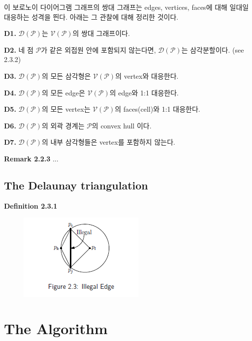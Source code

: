\documentclass{article}
\begin{document}
이 보로노이 다이어그램 그래프의 쌍대 그래프는 edges, vertices, faces에 대해 
일대일 대응하는 성격을 띈다. 아래는 그 관찰에 대해 정리한 것이다. 

\textbf{D1.} $\mathcal{D}(\mathcal{P})$는 $\mathcal{V}(\mathcal{P})$의 
쌍대 그래프이다. 

\textbf{D2.} 네 점 $\mathcal{P}$가 같은 외접원 안에 포함되지 않는다면, 
$\mathcal{D}(\mathcal{P})$는 삼각분할이다. (see 2.3.2)

\textbf{D3.}  $\mathcal{D}(\mathcal{P})$의 모든 삼각형은 
$\mathcal{V}(\mathcal{P})$의 vertex와 대응한다. 

\textbf{D4.}  $\mathcal{D}(\mathcal{P})$의 모든 edge은 
$\mathcal{V}(\mathcal{P})$의 edge와 1:1 대응한다. 

\textbf{D5.}  $\mathcal{D}(\mathcal{P})$의 모든 vertex는 
$\mathcal{V}(\mathcal{P})$의 faces(cell)와 1:1 대응한다. 

\textbf{D6.}  $\mathcal{D}(\mathcal{P})$의 외곽 경계는 
$\mathcal{P}$의 convex hull 이다. 

\textbf{D7.}  $\mathcal{D}(\mathcal{P})$의 내부 삼각형들은 
vertex를 포함하지 않는다. 

\textbf{Remark 2.2.3} ... 

\subsection{The Delaunay triangulation}

\textbf{Definition 2.3.1}

\begin{figure}[h]
    \includegraphics{capture3.PNG}
\end{figure}
    
\section{The Algorithm}
\end{document}
